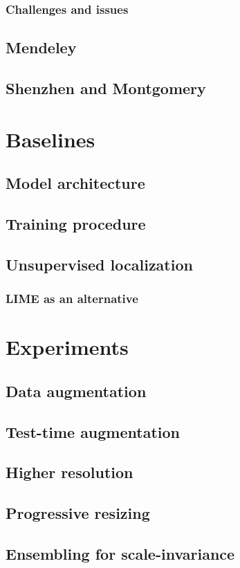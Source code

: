 \documentclass[11pt,twoside,a4paper]{report}
\begin{document}
        \subsection{Challenges and issues}
    \section{Mendeley}
    \section{Shenzhen and Montgomery}
\chapter{Baselines}
    \section{Model architecture}
    \section{Training procedure}
    \section{Unsupervised localization}
        \subsection{LIME as an alternative}
\chapter{Experiments}
    \section{Data augmentation}
    \section{Test-time augmentation}
    \section{Higher resolution}
    \section{Progressive resizing}
    \section{Ensembling for scale-invariance}
\end{document}
